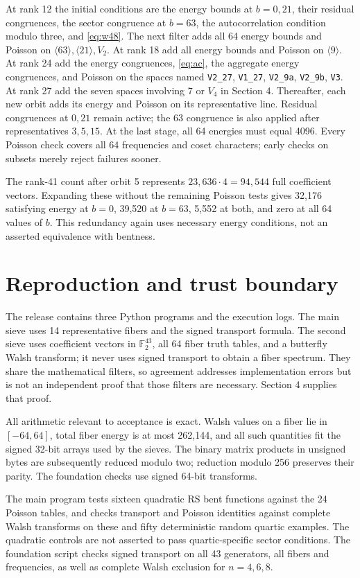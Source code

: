 \documentclass[11pt,a4paper]{article}
\newcommand{\F}{\mathbb F_2}
\begin{document}
At rank 12 the initial conditions are the energy bounds at $b=0,21$,
their residual congruences, the sector congruence at $b=63$, the
autocorrelation condition modulo three, and \eqref{eq:w48}. The next
filter adds all 64 energy bounds and Poisson on
$\langle63\rangle,\langle21\rangle,V_2$.
At rank 18 add all energy bounds and Poisson on $\langle9\rangle$.
At rank 24 add the energy congruences, \eqref{eq:ac}, the aggregate
energy congruences, and Poisson on the spaces named
\texttt{V2\_27}, \texttt{V1\_27}, \texttt{V2\_9a},
\texttt{V2\_9b}, \texttt{V3}.
At rank 27 add the seven spaces involving 7 or $V_4$ in Section 4.
Thereafter, each new orbit adds its energy and Poisson on its
representative line. Residual congruences at $0,21$ remain active;
the $63$ congruence is also applied after representatives $3,5,15$.
At the last stage, all 64 energies must equal 4096.
Every Poisson check covers all 64 frequencies and coset characters;
early checks on subsets merely reject failures sooner.

The rank-41 count after orbit 5 represents $23,636\cdot4=94,544$
full coefficient vectors. Expanding these without the remaining
Poisson tests gives 32,176 satisfying energy at $b=0$, 39,520 at
$b=63$, 5,552 at both, and zero at all 64 values of $b$.
This redundancy again uses necessary energy conditions, not an
asserted equivalence with bentness.

\section{Reproduction and trust boundary}
The release contains three Python programs and the execution logs.
The main sieve uses 14 representative fibers and the signed transport
formula. The second sieve uses coefficient vectors in $\F^{43}$,
all 64 fiber truth tables, and a butterfly Walsh transform; it never
uses signed transport to obtain a fiber spectrum. They share the
mathematical filters, so agreement addresses implementation errors
but is not an independent proof that those filters are necessary.
Section 4 supplies that proof.

All arithmetic relevant to acceptance is exact. Walsh values on a
fiber lie in $[-64,64]$, total fiber energy is at most 262,144, and
all such quantities fit the signed 32-bit arrays used by the sieves.
The binary matrix products in unsigned bytes are subsequently reduced
modulo two; reduction modulo 256 preserves their parity. The foundation
checks use signed 64-bit transforms.

The main program tests sixteen quadratic RS bent functions against
the 24 Poisson tables, and checks transport and Poisson identities
against complete Walsh transforms on these and fifty deterministic
random quartic examples. The quadratic controls are not asserted to
pass quartic-specific sector conditions. The foundation script checks
signed transport on all 43 generators, all fibers and frequencies,
as well as complete Walsh exclusion for $n=4,6,8$.
\end{document}
